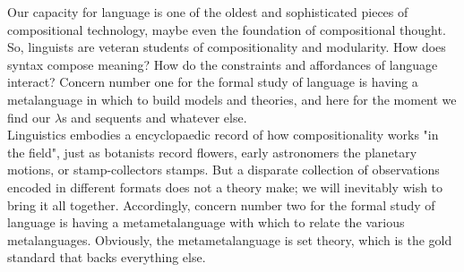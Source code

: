 Our capacity for language is one of the oldest and sophisticated pieces of compositional technology, maybe even the foundation of compositional thought. So, linguists are veteran students of compositionality and modularity. How does syntax compose meaning? How do the constraints and affordances of language interact? Concern number one for the formal study of language is having a metalanguage in which to build models and theories, and here for the moment we find our $\lambda$s and sequents and whatever else.\\

Linguistics embodies a encyclopaedic record of how compositionality works "in the field", just as botanists record flowers, early astronomers the planetary motions, or stamp-collectors stamps. But a disparate collection of observations encoded in different formats does not a theory make; we will inevitably wish to bring it all together. Accordingly, concern number two for the formal study of language is having a metametalanguage with which to relate the various metalanguages. Obviously, the metametalanguage is set theory, which is the gold standard that backs everything else.\\

